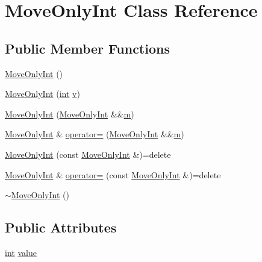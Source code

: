 \hypertarget{class_move_only_int}{}\section{Move\+Only\+Int Class Reference}
\label{class_move_only_int}
\subsection*{Public Member Functions}
\begin{DoxyCompactItemize}
\item 
\mbox{\hyperlink{class_move_only_int_a659f14d821c48ed2168fd1cd4eeaa06e}{Move\+Only\+Int}} ()
\item 
\mbox{\hyperlink{class_move_only_int_afd56968e421b3c01217d886feabc0700}{Move\+Only\+Int}} (\mbox{\hyperlink{warnings_8h_a74f207b5aa4ba51c3a2ad59b219a423b}{int}} \mbox{\hyperlink{_s_d_l__opengl_8h_a10a82eabcb59d2fcd74acee063775f90}{v}})
\item 
\mbox{\hyperlink{class_move_only_int_a1206fb358070ec12f86f23546b950294}{Move\+Only\+Int}} (\mbox{\hyperlink{class_move_only_int}{Move\+Only\+Int}} \&\&\mbox{\hyperlink{_s_d_l__opengl__glext_8h_af593500c283bf1a787a6f947f503a5c2}{m}})
\item 
\mbox{\hyperlink{class_move_only_int}{Move\+Only\+Int}} \& \mbox{\hyperlink{class_move_only_int_abaea90c13c4d176a3bd5a29b73ea98b2}{operator=}} (\mbox{\hyperlink{class_move_only_int}{Move\+Only\+Int}} \&\&\mbox{\hyperlink{_s_d_l__opengl__glext_8h_af593500c283bf1a787a6f947f503a5c2}{m}})
\item 
\mbox{\hyperlink{class_move_only_int_a715d65919902e6ce3adee847922bd4d0}{Move\+Only\+Int}} (const \mbox{\hyperlink{class_move_only_int}{Move\+Only\+Int}} \&)=delete
\item 
\mbox{\hyperlink{class_move_only_int}{Move\+Only\+Int}} \& \mbox{\hyperlink{class_move_only_int_a080476a798f7b0a8b8cfe34b564f5a03}{operator=}} (const \mbox{\hyperlink{class_move_only_int}{Move\+Only\+Int}} \&)=delete
\item 
\mbox{\hyperlink{class_move_only_int_a7b2b62e72f26133493d7757798be185a}{$\sim$\+Move\+Only\+Int}} ()
\end{DoxyCompactItemize}
\subsection*{Public Attributes}
\begin{DoxyCompactItemize}
\item 
\mbox{\hyperlink{warnings_8h_a74f207b5aa4ba51c3a2ad59b219a423b}{int}} \mbox{\hyperlink{class_move_only_int_a52438f73215cbad2bf78fb79c06cf348}{value}}
\end{DoxyCompactItemize}


